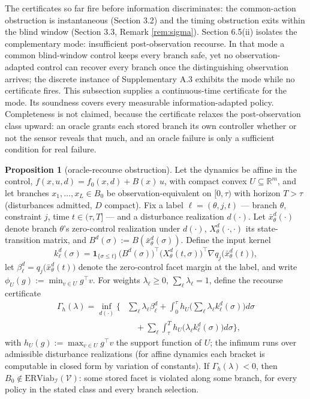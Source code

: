\documentclass[10pt,twocolumn]{article}
\theoremstyle{definition}
\newtheorem{proposition}{Proposition}
\begin{document}
The certificates so far fire before information discriminates: the
common-action obstruction is instantaneous (Section 3.2) and the timing
obstruction exits within the blind window (Section 3.3, Remark
\ref{rem:sigma}). Section 6.5(ii) isolates the complementary mode:
insufficient post-observation recourse. In that mode a common blind-window
control keeps every branch safe, yet no observation-adapted control can
recover every branch once the distinguishing observation arrives; the discrete
instance of Supplementary A.3 exhibits the mode while no certificate fires.
This subsection supplies a continuous-time certificate for the mode. Its
soundness covers every measurable information-adapted policy. Completeness is
not claimed, because the certificate relaxes the post-observation class
upward: an oracle grants each stored branch its own controller whether or not
the sensor reveals that much, and an oracle failure is only a sufficient
condition for real failure.

\begin{proposition}[oracle-recourse obstruction]\label{prop:recourse}
Let the dynamics be affine in the control,
\(f(x,u,d) = f_0(x,d) + B(x)\,u\), with compact convex
\(U \subseteq \mathbb{R}^m\), and let branches
\(x_1, \dots, x_L \in B_0\) be observation-equivalent on \([0, \tau)\) with
horizon \(T > \tau\) (disturbances admitted, \(D\) compact). Fix a label
\(\ell = (\theta, j, t)\) --- branch \(\theta\), constraint \(j\), time
\(t \in (\tau, T]\) --- and a disturbance realization \(d(\cdot)\). Let
\(\bar x_\theta^d(\cdot)\) denote branch \(\theta\)'s zero-control
realization under \(d(\cdot)\), \(X_\theta^d(\cdot, \cdot)\) its
state-transition matrix, and \(B^d(\sigma) := B(\bar x_\theta^d(\sigma))\).
Define the input kernel
\[k_\ell^d(\sigma) = \mathbf{1}_{\{\sigma \le t\}}\,
\big(B^d(\sigma)\big)^{\top}
\big(X_\theta^d(t, \sigma)\big)^{\top}
\nabla q_j\big(\bar x_\theta^d(t)\big),\]
let \(\beta_\ell^d = q_j\big(\bar x_\theta^d(t)\big)\) denote the
zero-control facet margin at the label, and write
\(\phi_U(g) := \min_{v \in U} g^{\top} v\). For weights
\(\lambda_\ell \ge 0\), \(\sum_\ell \lambda_\ell = 1\), define the recourse certificate \[\begin{aligned} \Gamma_{h}(\lambda) = \inf_{d(\cdot)} \Big\{ &\sum_{\ell} \lambda_{\ell} \beta_{\ell}^{d} + \int_0^{\tau} h_U\Big(\sum_{\ell} \lambda_\ell k_\ell^d(\sigma)\Big) d\sigma \\ &\quad + \sum_{\ell} \int_{\tau}^{T} h_U\big(\lambda_\ell k_\ell^d(\sigma)\big) d\sigma \Big\}, \end{aligned}\] with \(h_U(g) := \max_{v \in U} g^{\top} v\) the support function of \(U\); the infimum runs over admissible disturbance realizations (for affine dynamics each bracket is computable in closed form by variation of constants). If \(\Gamma_{h}(\lambda) < 0\), then \(B_0 \notin \mathrm{ERViab}_{\mathcal{I}}(\mathcal{V})\): some stored facet is violated along some branch, for every policy in the stated class and every branch selection.
\end{proposition}
\end{document}
